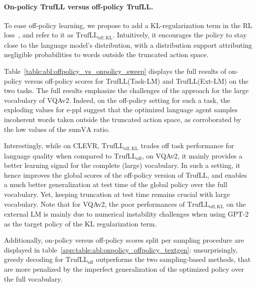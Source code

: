 \documentclass{article}
\newcommand{\algo}{TrufLL\xspace}
\begin{document}
\paragraph{On-policy \algo versus off-policy \algo.}
To ease off-policy learning, we propose to add a KL-regularization term in the RL loss~\citep{jaques2017sequence, jaques2019way, wu2019alternating}, and refer to it as $\mathrm{\algo_{\mathrm{off, KL}}}$.
Intuitively, it encourages the policy to stay close to the language model's distribution, with a distribution support attributing negligible probabilities to words outside the truncated action space. 


Table~\ref{table:abl:offpolicy_vs_onpolicy_sweep} displays the full results of on-policy versus off-policy scores for \algo(Task-LM) and \algo(Ext-LM) on the two tasks. The full results emphasize the challenges of the approach for the large vocabulary of VQAv2. Indeed, on the off-policy setting for such a task, the exploding values for e-ppl suggest that the optimized language agent samples incoherent words taken outside the truncated action space, as corroborated by the low values of the $\mathrm{sumVA}$ ratio.  

Interestingly, while on CLEVR, $\mathrm{\algo}_{\mathrm{off,KL}}$ trades off task performance for language quality when compared to $\mathrm{\algo}_{\mathrm{off}}$, on VQAv2, it mainly provides a better learning signal for the complete (large) vocabulary. In such a setting, it hence improves the global scores of the off-policy version of \algo, and enables a much better generalization at test time of the global policy over the full vocabulary. Yet, keeping truncation at test time remains crucial with large vocabulary. Note that for VQAv2, the poor performances of $\mathrm{\algo}_{\mathrm{off,KL}}$ on the external LM is mainly due to numerical instability challenges when using GPT-2 as the target policy of the KL regularization term. 


Additionally, on-policy versus off-policy scores split per sampling procedure are displayed in table~\ref{app:table:abl:onpolicy_offpolicy_textgen}: unsurprisingly, greedy decoding for $\mathrm{\algo}_{\mathrm{off}}$ outperforms the two sampling-based methods, that are more penalized by the imperfect generalization of the optimized policy over the full vocabulary. 
\end{document}
